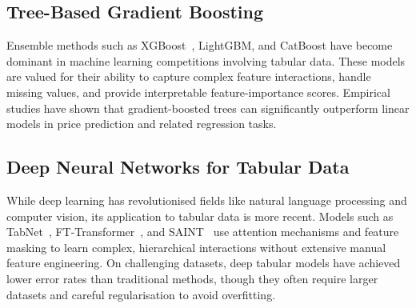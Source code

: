 \subsection{Tree-Based Gradient Boosting}
Ensemble methods such as XGBoost~\cite{chen2016xgboost}, LightGBM, and CatBoost have become dominant in machine learning competitions involving tabular data. These models are valued for their ability to capture complex feature interactions, handle missing values, and provide interpretable feature-importance scores. Empirical studies have shown that gradient-boosted trees can significantly outperform linear models in price prediction and related regression tasks.

\subsection{Deep Neural Networks for Tabular Data}
While deep learning has revolutionised fields like natural language processing and computer vision, its application to tabular data is more recent. Models such as TabNet~\cite{arik2021tabnet}, FT-Transformer~\cite{gorishniy2021revisiting}, and SAINT~\cite{somepalli2021saint} use attention mechanisms and feature masking to learn complex, hierarchical interactions without extensive manual feature engineering. On challenging datasets, deep tabular models have achieved lower error rates than traditional methods, though they often require larger datasets and careful regularisation to avoid overfitting.



